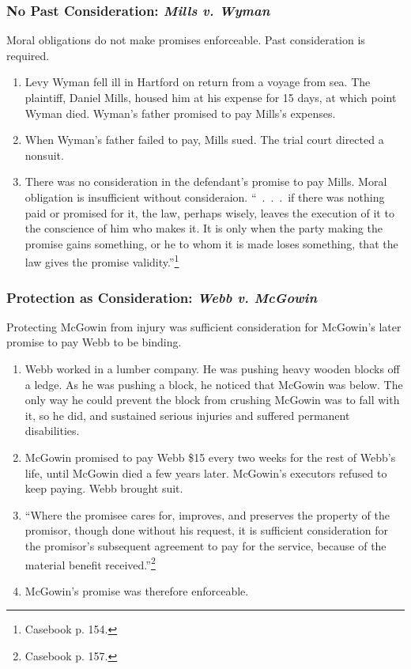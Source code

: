\subsubsection{No Past Consideration: \emph{Mills v. Wyman}}

Moral obligations do not make promises enforceable. Past consideration is 
required.

\begin{enumerate}
    \item Levy Wyman fell ill in Hartford on return from a voyage from sea. 
    The plaintiff, Daniel Mills, housed him at his expense for 15 days, at 
    which point Wyman died. Wyman's father promised to pay Mills's expenses.
    \item When Wyman's father failed to pay, Mills sued. The trial court 
    directed a nonsuit.
    \item There was no consideration in the defendant's promise to pay Mills. 
    Moral obligation is insufficient without consideraion. ``~.~.~.~if there 
    was nothing paid or promised for it, the law, perhaps wisely, leaves the 
    execution of it to the conscience of him who makes it. It is only when the 
    party making the promise gains something, or he to whom it is made loses 
    something, that the law gives the promise validity.''\footnote{Casebook p. 
    154.}
\end{enumerate}

\subsubsection{Protection as Consideration: \emph{Webb v. McGowin}}

Protecting McGowin from injury was sufficient consideration for McGowin's 
later promise to pay Webb to be binding.

\begin{enumerate}
    \item Webb worked in a lumber company. He was pushing heavy wooden blocks 
    off a ledge. As he was pushing a block, he noticed that McGowin was below. 
    The only way he could prevent the block from crushing McGowin was to fall 
    with it, so he did, and sustained serious injuries and suffered permanent 
    disabilities.
    \item McGowin promised to pay Webb \$15 every two weeks for the rest of 
    Webb's life, until McGowin died a few years later. McGowin's executors 
    refused to keep paying. Webb brought suit.
    \item ``Where the promisee cares for, improves, and preserves the property 
    of the promisor, though done without his request, it is sufficient 
    consideration for the promisor's subsequent agreement to pay for the 
    service, because of the material benefit received.''\footnote{Casebook p. 
    157.}
    \item McGowin's promise was therefore enforceable.
\end{enumerate}

